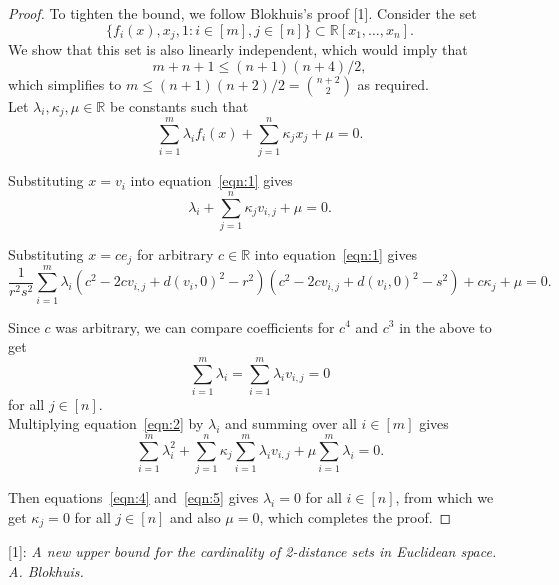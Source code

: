 \documentclass{article}
\begin{document}
\begin{enumerate}
\begin{enumerate}
\begin{proof}
          To tighten the bound, we follow Blokhuis's proof [1]. Consider
          the set
          \[\{f_i(x), x_j, 1: i\in[m], j\in[n]\}
          \subset\mathbb{R}[x_1,\ldots,x_n].\]
          We show that this set is also linearly independent, which would
          imply that
          \[m+n+1 \leq(n+1)(n+4)/2,\]
          which simplifies to $m\leq(n+1)(n+2)/2=\binom{n+2}{2}$ as
          required. \\

          Let $\lambda_i,\kappa_j,\mu\in\mathbb{R}$ be constants such that
          \begin{equation}
            \sum_{i=1}^m \lambda_i f_i(x) +\sum_{j=1}^n \kappa_jx_j
            +\mu=0.
            \label{eqn:1}
          \end{equation}

          Substituting $x=v_i$ into equation~\eqref{eqn:1} gives
          \begin{equation}
            \lambda_i +\sum_{j=1}^n \kappa_jv_{i,j} +\mu=0.
            \label{eqn:2}
          \end{equation}

          Substituting $x=ce_j$ for arbitrary $c\in\mathbb{R}$ into
          equation~\eqref{eqn:1} gives
          \begin{equation}
            \frac{1}{r^2s^2} \sum_{i=1}^m \lambda_i
            (c^2-2cv_{i,j}+d(v_i,0)^2-r^2) (c^2-2cv_{i,j}+d(v_i,0)^2-s^2)
            +c\kappa_j +\mu=0.
            \label{eqn:3}
          \end{equation}

          Since $c$ was arbitrary, we can compare coefficients for $c^4$ and
          $c^3$ in the above to get
          \begin{equation}
            \sum_{i=1}^m \lambda_i =\sum_{i=1}^m \lambda_iv_{i,j} =0
            \label{eqn:4}
          \end{equation}
          for all $j\in[n]$.\\

          Multiplying equation~\eqref{eqn:2} by
          $\lambda_i$ and summing over all $i\in[m]$ gives
          \begin{equation}
            \sum_{i=1}^m \lambda_i^2 +\sum_{j=1}^n \kappa_j \sum_{i=1}^m
            \lambda_iv_{i,j} +\mu\sum_{i=1}^m \lambda_i =0.
            \label{eqn:5}
          \end{equation}

          Then equations~\eqref{eqn:4} and~\eqref{eqn:5} gives
          $\lambda_i=0$ for all $i\in[n]$, from which we get $\kappa_j=0$
          for all $j\in[n]$ and also $\mu=0$, which completes the proof.
        \end{proof}
    \end{enumerate}
\end{enumerate}

[1]: \it A new upper bound for the cardinality of 2-distance sets in
Euclidean space. A. Blokhuis.
\end{document}
